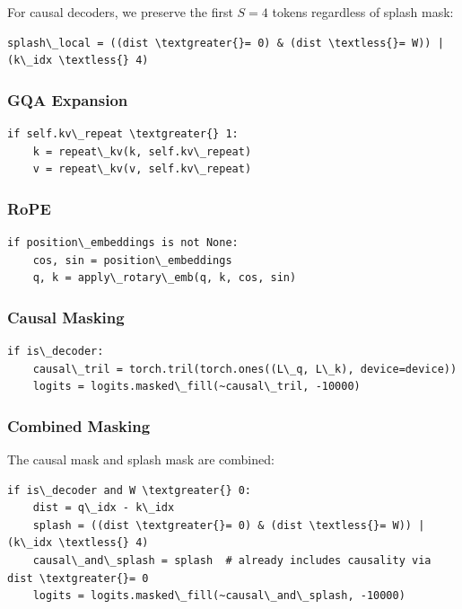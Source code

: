 For causal decoders, we preserve the first $S = 4$ tokens regardless of 
splash mask:

\begin{lstlisting}
splash\_local = ((dist \textgreater{}= 0) & (dist \textless{}= W)) | (k\_idx \textless{} 4)
\end{lstlisting}

\subsubsection{GQA Expansion}

\begin{lstlisting}
if self.kv\_repeat \textgreater{} 1:
    k = repeat\_kv(k, self.kv\_repeat)
    v = repeat\_kv(v, self.kv\_repeat)
\end{lstlisting}

\subsubsection{RoPE}

\begin{lstlisting}
if position\_embeddings is not None:
    cos, sin = position\_embeddings
    q, k = apply\_rotary\_emb(q, k, cos, sin)
\end{lstlisting}

\subsubsection{Causal Masking}

\begin{lstlisting}
if is\_decoder:
    causal\_tril = torch.tril(torch.ones((L\_q, L\_k), device=device))
    logits = logits.masked\_fill(~causal\_tril, -10000)
\end{lstlisting}

\subsubsection{Combined Masking}

The causal mask and splash mask are combined:

\begin{lstlisting}
if is\_decoder and W \textgreater{} 0:
    dist = q\_idx - k\_idx
    splash = ((dist \textgreater{}= 0) & (dist \textless{}= W)) | (k\_idx \textless{} 4)
    causal\_and\_splash = splash  # already includes causality via dist \textgreater{}= 0
    logits = logits.masked\_fill(~causal\_and\_splash, -10000)
\end{lstlisting}

